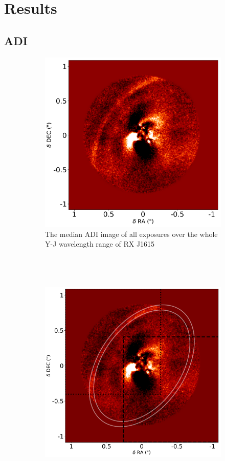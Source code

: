 \documentclass[twoside,single]{lion-msc}
\begin{document}
\chapter{Results}
\section{ADI}
\begin{figure}[!b]
\centering
\begin{subfigure}{.48\textwidth}
  \centering
  \includegraphics[width=0.8\linewidth]{ADI_tot}
  \caption{The median ADI image of all exposures over the whole Y-J wavelength range of RX J1615\\\\\\\\}
  \label{fig:ADItot}
\end{subfigure}\hfill
\begin{subfigure}{.48\textwidth}
  \centering
  \includegraphics[width=0.8\linewidth]{totapertures}%

\end{subfigure}
\end{figure}
\end{document}
